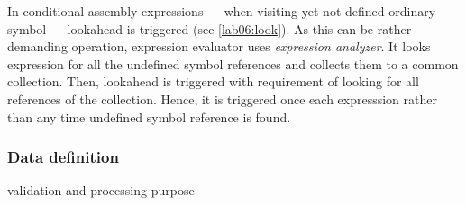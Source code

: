 In conditional assembly expressions --- when visiting yet not defined ordinary symbol --- lookahead is triggered (see \cref{lab06:look}). As this can be rather demanding operation, expression evaluator uses \emph{expression analyzer}. It looks expression for all the undefined symbol references and collects them to a common collection. Then, lookahead is triggered with requirement of looking for all references of the collection. Hence, it is triggered once each expresssion rather than any time undefined symbol reference is found. 


\subsubsection{Data definition}

validation and processing purpose